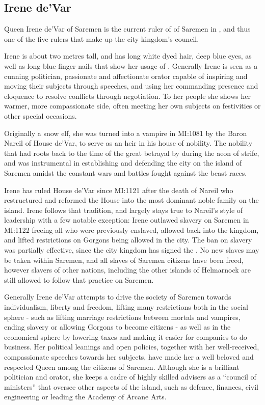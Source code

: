 \subsection{Irene de'Var}
\label{sec:Irene deVar}

Queen Irene de'Var of Saremen is the current ruler of  of Saremen in , and thus one of the five
rulers that make up the city kingdom's council.

Irene is about two metres tall, and has long white dyed hair, deep blue eyes,
as well as long blue finger nails that show her usage of .
Generally Irene is seen as a cunning politician, passionate and affectionate
orator capable of inspiring and moving their subjects through speeches, and
using her commanding presence and eloquence to resolve conflicts through
negotiation. To her people she shows her warmer, more compassionate side,
often meeting her own subjects on festivities or other special occasions.

Originally a snow elf, she was turned into a vampire in MI:1081 by the Baron
Nareil of House de'Var, to serve as an heir in his house of nobility. The
nobility that had roots back to the time of the great betrayal by
 during the aeon of strife, and was instrumental in
establishing and defending the city on the island of Saremen amidst the
constant wars and battles fought against the beast races.

Irene has ruled House de'Var since MI:1121 after the death of Nareil who
restructured and reformed the House into the most dominant noble family on the
island. Irene follows that tradition, and largely stays true to Nareil's style
of leadership with a few notable exception: Irene outlawed slavery on Saremen
in MI:1122 freeing all who were previously enslaved, allowed 
back into the kingdom, and lifted restrictions on Gorgons being allowed in the
city. The ban on slavery was partially effective, since the city kingdom has
signed the .  No new slaves may be taken within
Saremen, and all slaves of Saremen citizens have been freed, however slavers
of other nations, including the other islands of Helmarnock are still allowed
to follow that practice on Saremen.

Generally Irene de'Var attempts to drive the society of Saremen towards
individualism, liberty and freedom, lifting many restrictions both in the
social sphere - such as lifting marriage restrictions between mortals and
vampires, ending slavery or allowing Gorgons to become citizens - as well as
in the economical sphere by lowering taxes and making it easier for companies
to do business. Her political leanings and open policies, together with her
well-received, compassionate speeches towards her subjects, have made her a
well beloved and respected Queen among the citizens of Saremen. Although she
is a brilliant politician and orator, she keeps a cadre of highly skilled
advisers as a ``council of ministers'' that oversee other aspects of the
island, such as defence, finances, civil engineering or leading the Academy
of Arcane Arts.

